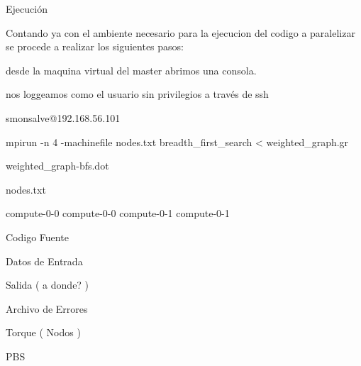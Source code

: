 Ejecución

Contando ya con el ambiente necesario para la ejecucion del codigo a paralelizar se procede a realizar los siguientes pasos: 


desde la maquina virtual del master abrimos una consola. 

nos loggeamos como el usuario sin privilegios a través de ssh

smonsalve@192.168.56.101



mpirun -n 4 -machinefile nodes.txt breadth_first_search < weighted_graph.gr

weighted_graph-bfs.dot




nodes.txt


compute-0-0
compute-0-0
compute-0-1
compute-0-1




Codigo Fuente

Datos de Entrada

Salida ( a donde? )

Archivo de Errores

Torque  ( Nodos  )

PBS
 